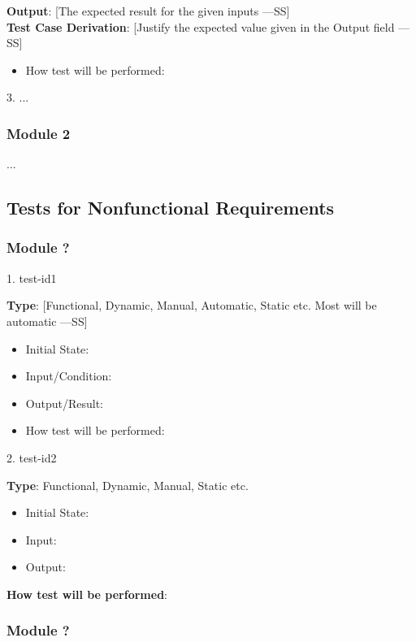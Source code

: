 \documentclass[12pt, titlepage]{article}
\begin{document}
\textbf{Output}: [The expected result for the given inputs —SS]\\
\textbf{Test Case Derivation}: [Justify the expected value given in the Output field —SS]\\
\begin{itemize}
  \item How test will be performed:
\end{itemize}

3. ...

\subsubsection{Module 2}

...

\subsection{Tests for Nonfunctional Requirements}

\subsubsection{Module ?}

1. test-id1

\textbf{Type}: [Functional, Dynamic, Manual, Automatic, Static etc. Most will be automatic —SS]\\
\begin{itemize}
  \item Initial State:
  \item Input/Condition:
  \item Output/Result:
  \item How test will be performed:
\end{itemize}

2. test-id2

\textbf{Type}: Functional, Dynamic, Manual, Static etc.\\
\begin{itemize}
  \item Initial State:
  \item Input:
  \item Output:
\end{itemize}

\textbf{How test will be performed}: \\
\subsubsection{Module ?}
\end{document}
